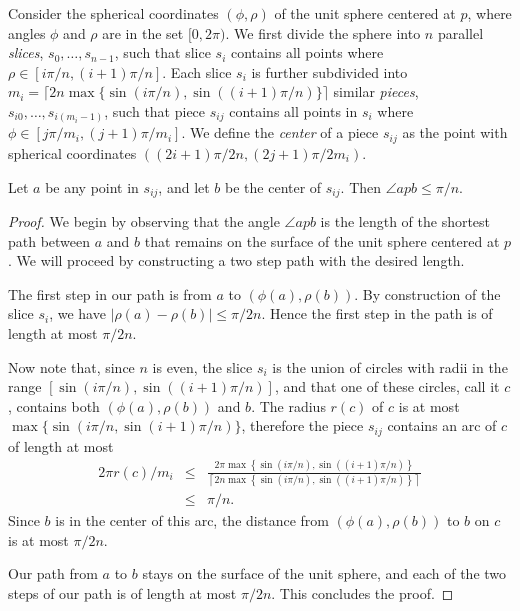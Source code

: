 \documentclass[11pt]{article}
\begin{document}
Consider the spherical coordinates $(\phi,\rho)$ of the unit sphere
centered at $p$, where angles $\phi$ and $\rho$ are in the set
$[0,2\pi)$.  We first divide the sphere into $n$ parallel {\em
slices}, $s_0,\ldots,s_{n-1}$, such that slice $s_i$ contains all
points where $\rho\in[i\pi/n,(i+1)\pi/n]$.  Each slice $s_i$ is
further subdivided into
$m_i=\lceil2n\max\{\sin(i\pi/n),\sin((i+1)\pi/n)\}\rceil$ similar {\em
pieces}, $s_{i0},\ldots,s_{i(m_i-1)}$, such that piece $s_{ij}$
contains all points in $s_i$ where $\phi\in[j\pi/m_i,(j+1)\pi/m_i]$.
We define the \emph{center} of a piece $s_{ij}$ as the point with
spherical coordinates $((2i+1)\pi/2n, (2j+1)\pi/2m_i)$.

\begin{lem}
Let $a$ be any point in $s_{ij}$, and let $b$ be the center of
$s_{ij}$.  Then $\angle apb\le \pi/n$.
\end{lem}

\begin{proof}
We begin by observing that the angle $\angle apb$ is the length of the
shortest path between $a$ and $b$ that remains on the surface of the
unit sphere centered at $p$.  We will proceed by constructing a two
step path with the desired length.

The first step in our path is from $a$ to $(\phi(a),\rho(b))$.  By
construction of the slice $s_i$, we have $|\rho(a)-\rho(b)|\le
\pi/2n$.  Hence the first step in the path is of length at most
$\pi/2n$.

Now note that, since $n$ is even, the slice $s_i$ is the union of
circles with radii in the range $[\sin(i\pi/n),\sin((i+1)\pi/n)]$, and
that one of these circles, call it $c$, contains both
$(\phi(a),\rho(b))$ and $b$.  The radius $r(c)$ of $c$ is at most
$\max\{\sin(i\pi/n,\sin(i+1)\pi/n)\}$, therefore the piece $s_{ij}$
contains an arc of $c$ of length at most
\begin{eqnarray*}
2\pi r(c)/m_i
 & \le & \frac{2\pi\max\left\{\sin(i\pi/n), \sin((i+1)\pi/n)\right\}}
               {\left\lceil 2n\max\left\{\sin(i\pi/n), \sin((i+1)\pi/n)\right\}\right\rceil} \nonumber \\
 & \le & \pi/n.
\end{eqnarray*}
Since $b$ is in the center of this arc, the distance from
$(\phi(a),\rho(b))$ to $b$ on $c$ is at most $\pi/2n$.

Our path from $a$ to $b$ stays on the surface of the unit sphere, and
each of the two steps of our path is of length at most $\pi/2n$.  This
concludes the proof.
\end{proof}
\end{document}
